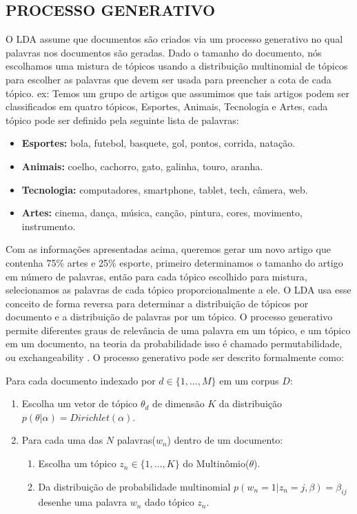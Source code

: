 \documentclass[12pt,a4paper]{article}
\begin{document}
\subsection{PROCESSO GENERATIVO}
O LDA assume que documentos são criados via um processo generativo no qual palavras nos documentos são geradas. Dado o tamanho do documento, nós escolhamos uma mistura de tópicos usando a distribuição multinomial de tópicos para escolher as palavras que devem ser usada para preencher a cota de cada tópico. ex: Temos um grupo de artigos que assumimos que tais artigos podem ser classificados em quatro tópicos, Esportes, Animais, Tecnologia e Artes, cada tópico pode ser definido pela seguinte lista de palavras:

\begin{itemize}
  \item \textbf{ Esportes:} bola, futebol, basquete, gol, pontos, corrida, natação.
  \item \textbf{ Animais:} coelho, cachorro, gato, galinha, touro, aranha.
  \item \textbf{ Tecnologia:} computadores, smartphone, tablet, tech, câmera, web.
  \item \textbf{ Artes:} cinema, dança, música, canção, pintura, cores, movimento, instrumento.
\end{itemize}

Com as informações apresentadas acima, queremos gerar um novo artigo que contenha 75\% artes e 25\% esporte, primeiro determinamos o tamanho do artigo em número de palavras, então para cada tópico escolhido para mistura, selecionamos as palavras de cada tópico proporcionalmente a ele. O LDA usa esse conceito de forma reversa para determinar a distribuição de tópicos por documento e a distribuição de palavras por um tópico. O processo generativo permite diferentes graus de relevância de uma palavra em um tópico, e um tópico em um documento, na teoria da probabilidade isso é chamado permutabilidade, ou exchangeability \cite{aldous1985exchangeability}. O processo generativo pode ser descrito formalmente como:

Para cada documento indexado por $d \in \{1,. . . , M\}$ em um corpus $D$:

\begin{enumerate}
  \item Escolha um vetor de tópico $\theta _d$ de dimensão $K$ da distribuição $p(\theta|\alpha)=Dirichlet(\alpha)$.
  \item Para cada uma das $N$ palavras($w_n$) dentro de um documento:
  \begin{enumerate}
  	\item Escolha um tópico \(z_n \in \{1,. . . , K\}\) do Multinômio($\theta$).
    \item Da distribuição de probabilidade multinomial \(p(w_n=1| z_n=j,\beta)=\beta _{ij}\)  desenhe uma palavra $w_n$ dado tópico $z_n$.
  \end{enumerate}
\end{enumerate}
\end{document}
